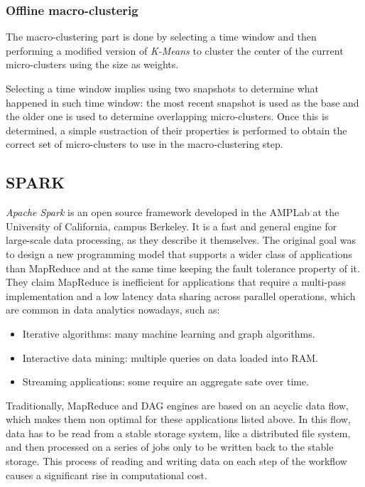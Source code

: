 \subsubsection{Offline macro-clusterig}

The macro-clustering part is done by selecting a time window and then performing a modified version of \textit{K-Means} to cluster the center of the current micro-clusters using the size as weights. 

Selecting a time window implies using two snapshots to determine what happened in such time window: the most recent snapshot is used as the base and the older one is used to determine overlapping micro-clusters. Once this is determined, a simple sustraction of their properties is performed to obtain the correct set of micro-clusters to use in the macro-clustering step.

\subsection{SPARK}
\textit{Apache Spark} is an open source framework developed in the AMPLab at the University of California, campus Berkeley\cite{SparkResearch}. It is a fast and general engine for large-scale data processing, as they describe it themselves. The original goal was to design a new programming model that supports a wider class of applications than MapReduce and at the same time keeping the fault tolerance property of it. They claim MapReduce is inefficient for applications that require a multi-pass implementation and a low latency data sharing across parallel operations, which are common in data analytics nowadays, such as: 

\begin{itemize}
 \item Iterative algorithms: many machine learning and graph algorithms.
 \item Interactive data mining: multiple queries on data loaded into RAM.
 \item Streaming applications: some require an aggregate sate over time.
\end{itemize}

Traditionally, MapReduce and DAG engines are based on an acyclic data flow, which makes them non optimal for these applications listed above. In this flow, data has to be read from a stable storage system, like a distributed file system, and then processed on a series of jobs only to be written back to the stable storage. This process of reading and writing data on each step of the workflow causes a significant rise in computational cost.

